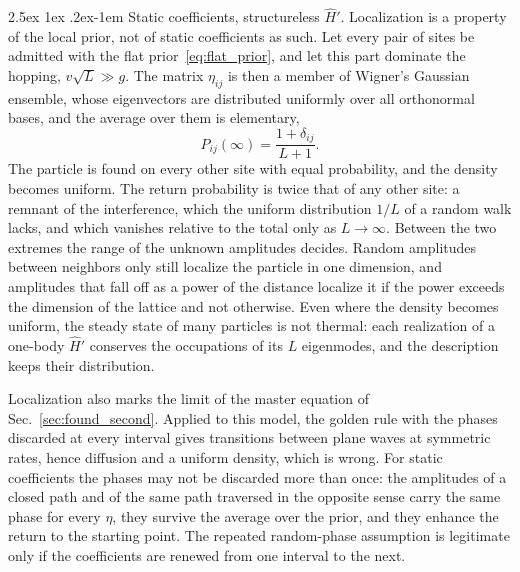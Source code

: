\documentclass[10pt,a4paper]{article}
\makeatletter
\renewcommand{\paragraph}{\@startsection{paragraph}{4}{\z@}%
  {2.5ex \@plus 1ex \@minus .2ex}{-1em}%
  {\normalfont\fontsize{14pt}{17pt}\selectfont\bfseries}}
\makeatother
\begin{document}
\paragraph{Static coefficients, structureless $ \hat H' $.}
Localization is a property of the local prior, not of static coefficients as such.
Let every pair of sites be admitted with the flat prior~\eqref{eq:flat_prior}, and let this part dominate the hopping, $ v\sqrt L \gg g $.
The matrix $ \eta_{ij} $ is then a member of Wigner's Gaussian ensemble, whose eigenvectors are distributed uniformly over all orthonormal bases, and the average over them is elementary,
\[
  P_{ij}(\infty) = \frac{1 + \delta_{ij}}{L + 1} .
\]
The particle is found on every other site with equal probability, and the density becomes uniform.
The return probability is twice that of any other site: a remnant of the interference, which the uniform distribution $ 1/L $ of a random walk lacks, and which vanishes relative to the total only as $ L \to \infty $.
Between the two extremes the range of the unknown amplitudes decides.
Random amplitudes between neighbors only still localize the particle in one dimension, and amplitudes that fall off as a power of the distance localize it if the power exceeds the dimension of the lattice and not otherwise.
Even where the density becomes uniform, the steady state of many particles is not thermal: each realization of a one-body $ \hat H' $ conserves the occupations of its $ L $ eigenmodes, and the description keeps their distribution.

Localization also marks the limit of the master equation of Sec.~\ref{sec:found_second}.
Applied to this model, the golden rule with the phases discarded at every interval gives transitions between plane waves at symmetric rates, hence diffusion and a uniform density, which is wrong.
For static coefficients the phases may not be discarded more than once: the amplitudes of a closed path and of the same path traversed in the opposite sense carry the same phase for every $ \eta $, they survive the average over the prior, and they enhance the return to the starting point.
The repeated random-phase assumption is legitimate only if the coefficients are renewed from one interval to the next.
\end{document}
